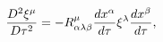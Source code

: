 \begin{equation}
\frac{D^{2}\xi ^{\mu }}{D\tau ^{2}}=-R_{\alpha \lambda \beta }^{\mu }\frac{%
dx^{\alpha }}{d\tau }\xi ^{\lambda }\frac{dx^{\beta }}{d\tau },  \label{13}
\end{equation}

